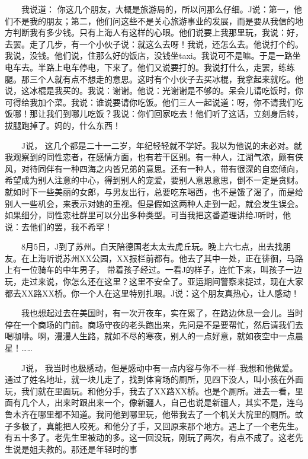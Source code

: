  　　我说道： 你这几个朋友，大概是旅游局的，所以问那么仔细。J说：第一，他们不是我的朋友；第二，他们问这些不是关心旅游事业的发展，而是要从我信的地方判断我有多少钱。只有上海人有这样的心眼。他们说要上我那里玩，我说：好，去罢。走了几步，有一个小伙子说：就这么去呀！我说，还怎么去。他说打个的。我说，没钱。他们说，住那么好的饭店，没钱坐taxi。我说可不是嘛。于是一路坐电车去。半路上电车停电，下来了。他们又说要打的。我说打什么，走罢，练练腿。那三个人就有点不想走的意思。这时有个小伙子去买冰棍，我拿起来就吃。他说，这冰棍是我买的。我说：谢谢。他说：光谢谢是不够的。呆会儿请吃饭时，你可得给我加个菜。我说：谁说要请你吃饭。他们三人一起说道：呀，你不请我们吃饭哪！那让我们到哪儿吃饭？我说：你们回家吃去！他们听了这话，立刻身后转，拔腿跑掉了。妈的，什么东西！ 
 
 　　J说， 这几个都是二十一二岁，年纪轻轻就不学好。我以为他说的未必对。就我观察到的同性恋者，在感情方面，也有若干区别。有一种人，江湖气浓，颇有侠风，对待同伴有一种四海之内皆兄弟的意思。还有一种人，带有很深的自恋倾向，希望成为别人注意的中心，得到别人的宠爱，要别人意思意思，倒不一定是贪财。就如时下一些美丽的女郎，与男友出行，总要吃东喝西，也不是饿了渴了，而是给别人一些机会，来表示对她的重视。但是假如这两种人走到一起，就会发生误会。如果细分，同性恋社群里可以分出多种类型。可当我把这番道理讲给J听时，他说：去他们的罢，我不希罕！ 
 
 　　8月5日，J到了苏州。白天陪德国老太太去虎丘玩。晚上六七点，出去找朋友。在上海听说苏州XX公园，XX报栏前都有。他去了其中一处，正在徘徊，马路上有一位骑车的中年男子， 带着孩子经过。一看J的样子，连忙下来，叫孩子一边玩，走过来说，你怎么还在这里？这里不安全了。亚运期间警察来捉过，现在大家都去XX路XX桥。你一个人在这里特别扎眼。J说：这个朋友真热心，让人感动！ 
 
 　　我也想起过去在美国时，有一次开夜车，实在累了，在路边休息一会儿。当时停在一个商场的门前。商场守夜的老头跑出来，先问是不是要帮忙，然后请我们去喝咖啡。啊，漫漫人生路，就如不尽的寒夜，别人的一点好意，就如夜空中一点晨星！…… 
 
 　　J说， 我当时也极感动，但是感动中有一点内容与你不一样--我想和他做爱。通过了姓名地址，就一块儿走了，找到体育场的厕所，见四下没人，叫小孩在外面玩，我们就在里面玩。和他分手，我去了XX路XX桥。也是个厕所。进去一看，里面有几个人，出来时跟出来一个，像新疆人，自己也说是新疆人，其实不是，连乌鲁木齐在哪里都不知道。我问他到哪里玩，他带我去了一个机关大院里的厕所。蚊子多极了，真能把人咬死。和他分了手，又回原来那个地方。遇上了一个老先生。有五十多了。老先生里被动的多。这一回没玩，刚玩了两次，有点不成了。这老先生说是姐夫教的。那还是年轻时的事 
 
